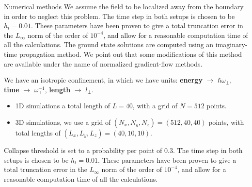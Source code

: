 \documentclass[final]{beamer}
\newlength{\colwidth}
\begin{document}
\begin{frame}[t]
\begin{columns}[t]
\begin{column}{\colwidth}
      \begin{block}{Numerical methods}
        We assume the field to be localized away from the boundary in order to neglect this problem. The time step in both setups is chosen to be $h_t = 0.01$. These parameters have been proven to give a total truncation error in the $L_\infty$ norm of the order of $10^{-4}$, and allow for a reasonable computation time of all the calculations.
        The ground state solutions are computed using an imaginary-time propagation method. We point out that some modifications of this method are available under the name of normalized gradient-flow methods.

        We have an isotropic confinement, in which we have units: \textbf{energy} $\longrightarrow$ $\hbar\omega_\perp$, \textbf{time}  $\rightarrow$ $\omega_\perp^{-1}$, \textbf{length} $\longrightarrow$ $l_\perp$.

        \begin{itemize}
            \item 1D simulations a total length of $L = 40$, with a grid of $N = 512$ points.
            \item  3D simulations, we use a grid of $(N_x, N_y, N_z) = (512, 40, 40)$ points, with  total lengths of $(L_x, L_y, L_z) = (40, 10, 10)$.
        \end{itemize}
        Collapse threshold is set to a probability per point of $0.3$.
          The time step in both setups is chosen to be $h_t = 0.01$. These parameters have been proven to give a total truncation error in the $L_{\infty}$ norm of the order of $10^{-4}$, and allow for a reasonable computation time of all the calculations.
      \end{block}



\end{column}
\end{columns}
\end{frame}
\end{document}
